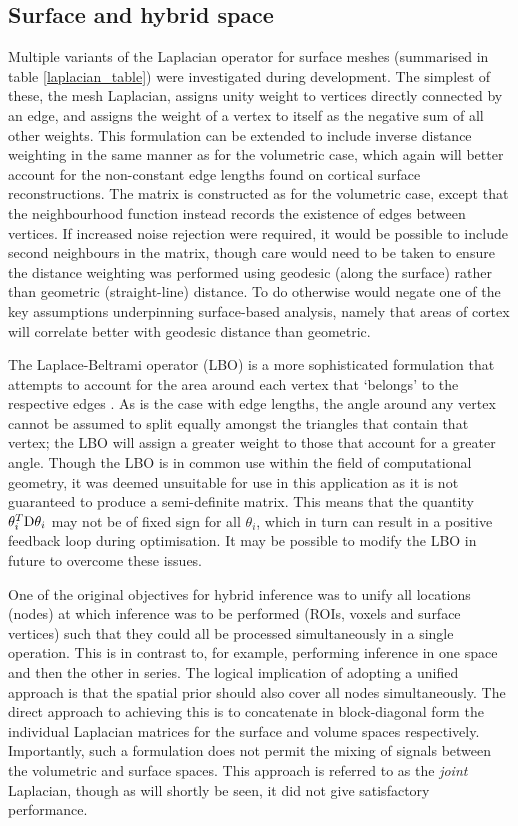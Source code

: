 \subsection{Surface and hybrid space}

Multiple variants of the Laplacian operator for surface meshes (summarised in table \ref{laplacian_table}) were investigated during development. The simplest of these, the mesh Laplacian, assigns unity weight to vertices directly connected by an edge, and assigns the weight of a vertex to itself as the negative sum of all other weights. This formulation can be extended to include inverse distance weighting in the same manner as for the volumetric case, which again will better account for the non-constant edge lengths found on cortical surface reconstructions. The matrix is constructed as for the volumetric case, except that the neighbourhood function instead records the existence of edges between vertices. If increased noise rejection were required, it would be possible to include second neighbours in the matrix, though care would need to be taken to ensure the distance weighting was performed using geodesic (along the surface) rather than geometric (straight-line) distance. To do otherwise would negate one of the key assumptions underpinning surface-based analysis, namely that areas of cortex will correlate better with geodesic distance than geometric. 

The Laplace-Beltrami operator (LBO) is a more sophisticated formulation that attempts to account for the area around each vertex that `belongs' to the respective edges \cite{Meyer2003}. As is the case with edge lengths, the angle around any vertex cannot be assumed to split equally amongst the triangles that contain that vertex; the LBO will assign a greater weight to those that account for a greater angle. Though the LBO is in common use within the field of computational geometry, it was deemed unsuitable for use in this application as it is not guaranteed to produce a semi-definite matrix. This means that the quantity $\theta_i^T \mathrm{D} \theta_i$ may not be of fixed sign for all $\theta_i$, which in turn can result in a positive feedback loop during optimisation. It may be possible to modify the LBO in future to overcome these issues. 

One of the original objectives for hybrid inference was to unify all locations (nodes) at which inference was to be performed (ROIs, voxels and surface vertices) such that they could all be processed simultaneously in a single operation. This is in contrast to, for example, performing inference in one space and then the other in series. The logical implication of adopting a unified approach is that the spatial prior should also cover all nodes simultaneously. The direct approach to achieving this is to concatenate in block-diagonal form the individual Laplacian matrices for the surface and volume spaces respectively. Importantly, such a formulation does not permit the mixing of signals between the volumetric and surface spaces. This approach is referred to as the \textit{joint} Laplacian, though as will shortly be seen, it did not give satisfactory performance. 

